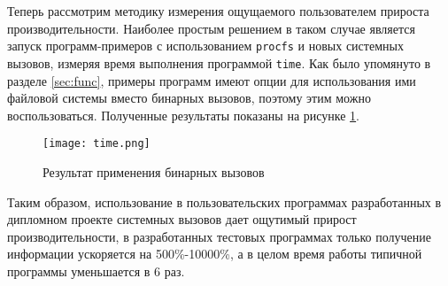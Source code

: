 Теперь рассмотрим методику измерения ощущаемого пользователем прироста
производительности. Наиболее простым решением в таком случае является запуск
программ-примеров с использованием \texttt{procfs} и новых системных вызовов,
измеряя время выполнения программой \texttt{time}. Как было упомянуто в разделе
\ref{sec:func}, примеры программ имеют опции для использования ими файловой
системы вместо бинарных вызовов, поэтому этим можно воспользоваться. Полученные
результаты показаны на рисунке \ref{fig:time}.

\begin{figure}
  \centering
  \texttt{[image: time.png]}
  \caption{Результат применения бинарных вызовов}
  \label{fig:time}
\end{figure}

Таким образом, использование в пользовательских программах разработанных в
дипломном проекте системных вызовов дает ощутимый прирост производительности, в
разработанных тестовых программах только получение информации ускоряется на
500\%-10000\%, а в целом время работы типичной программы уменьшается в 6 раз.
